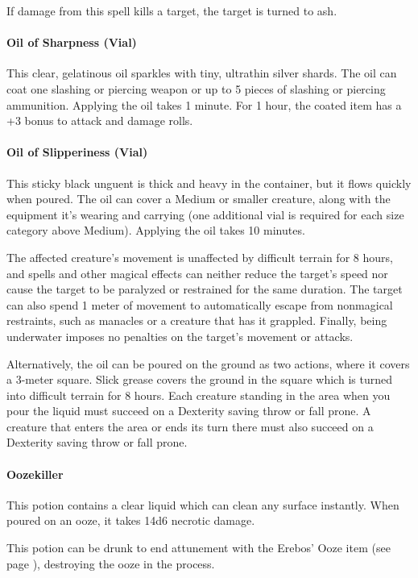         If damage from this spell kills a target, the target is turned to ash.
    \paragraph{Oil of Sharpness (Vial)}
        This clear, gelatinous oil sparkles with tiny, ultrathin silver shards.
        The oil can coat one slashing or piercing weapon or up to 5 pieces of slashing or piercing ammunition.
        Applying the oil takes 1 minute.
        For 1 hour, the coated item has a +3 bonus to attack and damage rolls.
    \paragraph{Oil of Slipperiness (Vial)} %
        This sticky black unguent is thick and heavy in the container, but it flows quickly when poured.
        The oil can cover a Medium or smaller creature, along with the equipment it's wearing and carrying (one additional vial is required for each size category above Medium).
        Applying the oil takes 10 minutes.

        The affected creature's movement is unaffected by difficult terrain for 8 hours, and spells and other magical effects can neither reduce the target's speed nor cause the target to be paralyzed or restrained for the same duration.
        The target can also spend 1 meter of movement to automatically escape from nonmagical restraints, such as manacles or a creature that has it grappled.
        Finally, being underwater imposes no penalties on the target's movement or attacks.

        Alternatively, the oil can be poured on the ground as two actions, where it covers a 3-meter square.
        Slick grease covers the ground in the square which is turned into difficult terrain for 8 hours.
        Each creature standing in the area when you pour the liquid must succeed on a Dexterity saving throw or fall prone.
        A creature that enters the area or ends its turn there must also succeed on a Dexterity saving throw or fall prone.
    \paragraph{Oozekiller} \label{item::oozekiller}
        This potion contains a clear liquid which can clean any surface instantly.
        When poured on an ooze, it takes 14d6 necrotic damage.

        This potion can be drunk to end attunement with the Erebos' Ooze item (see page \pageref{item::erebosooze}), destroying the ooze in the process.
